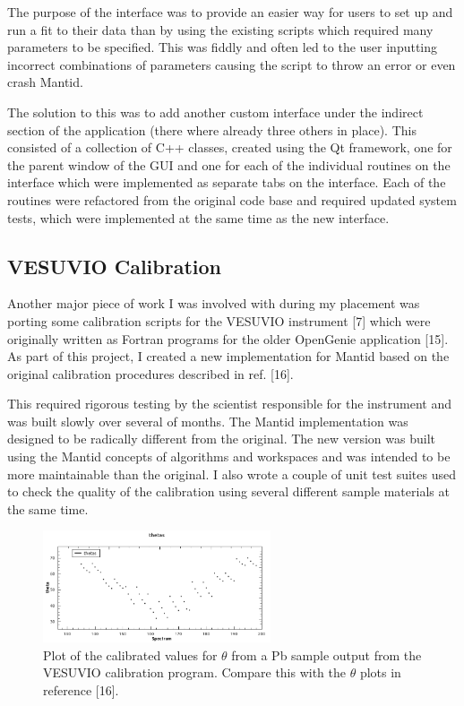\documentclass[paper=a4, fontsize=11pt]{scrartcl}	%
\numberwithin{equation}{section}															%
\numberwithin{figure}{section}																%
\numberwithin{table}{section}
\begin{document}
The purpose of the interface was to provide an easier way for users to
set up and run a fit to their data than by using the existing scripts
which required many parameters to be specified. This was fiddly and
often led to the user inputting incorrect combinations of parameters
causing the script to throw an error or even crash Mantid.

The solution to this was to add another custom interface under the
indirect section of the application (there where already three others in
place). This consisted of a collection of C++ classes, created using the
Qt framework, one for the parent window of the GUI and one for each of
the individual routines on the interface which were implemented as
separate tabs on the interface. Each of the routines were refactored
from the original code base and required updated system tests, which
were implemented at the same time as the new interface.

\subsection{VESUVIO Calibration}\label{vesuvio-calibration}

Another major piece of work I was involved with during my placement was
porting some calibration scripts for the VESUVIO instrument {[}7{]} which were
originally written as Fortran programs for the older OpenGenie
application {[}15{]}. As part of this project, I created a new
implementation for Mantid based on the original calibration procedures
described in ref. {[}16{]}.

This required rigorous testing by the scientist responsible for the
instrument and was built slowly over several of months. The Mantid
implementation was designed to be radically different from the original.
The new version was built using the Mantid concepts of algorithms and
workspaces and was intended to be more maintainable than the original. I
also wrote a couple of unit test suites used to check the quality of the
calibration using several different sample materials at the same time.

\begin{figure}[H]
\centering
\includegraphics[width=0.6\textwidth]{img/calib-theta.png}
\caption{Plot of the calibrated values for $\theta$ from a Pb sample output from the VESUVIO calibration program. Compare this with the $\theta$ plots in reference {[}16{]}.}
\label{fig:calib-theta}
\end{figure}
\end{document}

